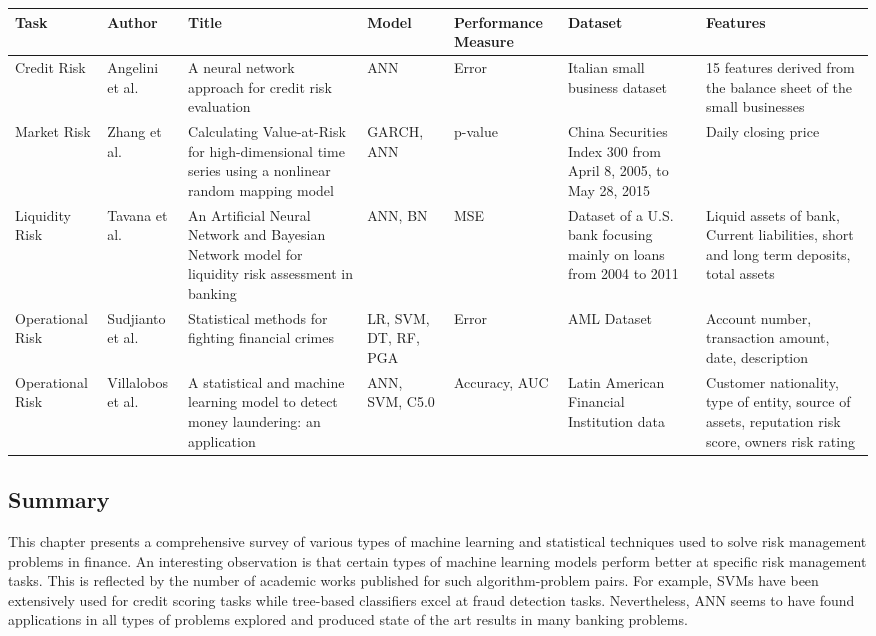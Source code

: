 \documentclass[a4paper, 12pt]{article}
\begin{document}
\begin{table}[H]
\bgroup
\def\arraystretch{1.5}
\begin{tabular}{ | p{1.9cm} | p{1.6cm}| p{2.1cm} | p{1.4cm}| p{2.3cm}| p{1.9cm}| p{2.2cm}| }
\hline
\textbf{Task} & \textbf{Author}  & \textbf{Title}  & \textbf{Model} & \textbf{Performance Measure}  & \textbf{Dataset}  & \textbf{Features} \\
 \hline

Credit Risk &
Angelini et al. \cite{angelini2008neural} &
A neural network approach for credit risk evaluation &
ANN &
Error &
Italian small business dataset &
15 features derived from the balance sheet of the small businesses
\\
\hline

Market Risk &
Zhang et al. \cite{zhang2017calculating} &
Calculating Value-at-Risk for high-dimensional time series using a nonlinear random mapping model &
GARCH, ANN &
p-value &
China Securities Index 300 from April 8, 2005, to May 28, 2015 &
Daily closing price
\\
\hline

Liquidity Risk &
Tavana et al. \cite{tavana2018artificial} &
An Artificial Neural Network and Bayesian Network model for liquidity risk assessment in banking &
ANN, BN &
MSE &
Dataset of a U.S. bank focusing mainly on loans from 2004 to 2011 &
Liquid assets of bank, Current liabilities, short and long term deposits, total assets 
\\
\hline

Operational Risk &
Sudjianto et al. \cite{sudjianto2010statistical} &
Statistical methods for fighting financial crimes &
LR, SVM, DT, RF, PGA &
Error &
AML Dataset &
Account number, transaction amount, date, description
\\
\hline


Operational Risk &
Villalobos et al. \cite{villalobos2017statistical} &
A statistical and machine learning model to detect money laundering: an application &
ANN, SVM, C5.0 &
Accuracy, AUC &
Latin American Financial Institution data &
Customer nationality, type of entity, source of assets, reputation risk score, owners risk rating 
\\
\hline


\end{tabular}
\egroup
\end{table}

\vskip 0.2in
\subsection{Summary}
This chapter presents a comprehensive survey of various types of machine learning and statistical techniques used to solve risk management problems in finance. An interesting observation is that certain types of machine learning models perform better at specific risk management tasks. This is reflected by the number of academic works published for such algorithm-problem pairs. For example, SVMs have been extensively used for credit scoring tasks while tree-based classifiers excel at fraud detection tasks. Nevertheless, ANN seems to have found applications in all types of problems explored and produced state of the art results in many banking problems.
\end{document}
